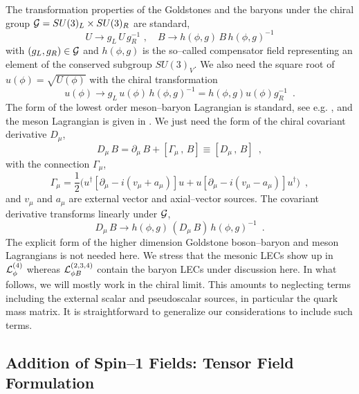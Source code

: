 The transformation properties of the
Goldstones and the baryons under the chiral group ${\cal G} = SU(3)_L
\times SU(3)_R$ are standard,
\begin{equation}
U \to g_L \, U \, g_R^{-1} \, \, , \quad
B \to h(\phi,g) \, B \, h(\phi,g)^{-1}
\label{ccwz}
\end{equation}
with $(g_L,g_R) \in {\cal G}$ and $h(\phi, g)$ is the so--called
compensator field representing an element of the conserved subgroup
$SU(3)_V$. We also need the square root of $u(\phi) = \sqrt{U(\phi )}$
with the chiral transformation
\begin{equation}
u(\phi ) \to g_L \, u(\phi ) \, h(\phi,g)^{-1} = h(\phi, g)
u(\phi ) g_R^{-1} \,  \, \, .
\label{sqrtu}
\end{equation}
The form of the lowest order meson--baryon
Lagrangian is standard, see e.g. \cite{bkmz}, and the
meson Lagrangian is given in \cite{gl85}. We just need the form of the
chiral covariant derivative $D_\mu$,
\begin{equation}
D_\mu \, B  = \partial_\mu \, B + [ \Gamma_\mu \, , \, B ]
\equiv [D_\mu \, , \, B] \, \, \, ,
\label{cova1}
\end{equation}
with the connection $\Gamma_\mu$,
\begin{equation}
\Gamma_\mu  = \frac{1}{2} \biggl( u^\dagger [\partial_\mu
-i(v_\mu+a_\mu)]u + u [\partial_\mu-i(v_\mu-a_\mu) ]u^\dagger
\biggr) \, \, \, ,
\label{cova2}
\end{equation}
and $v_\mu$ and $a_\mu$ are external vector and axial--vector sources.
The covariant derivative transforms linearly under ${\cal G}$,
\begin{equation}
D_\mu \, B \to h(\phi, g) \, (D_\mu \, B) \, h(\phi , g)^{-1}
\, \, \, .
\label{covg}
\end{equation}
The explicit form of the higher dimension  Goldstone boson--baryon
and meson Lagrangians is not needed here. We stress that the mesonic
LECs show up in ${\cal L}_{\phi}^{(4)}$ whereas  ${\cal L}_{\phi
  B}^{(2,3,4)}$ contain the baryon LECs under discussion here.
In what follows, we will mostly work in the chiral limit. This amounts
to neglecting terms including the external scalar and pseudoscalar
sources, in particular the quark mass matrix. It is straightforward to
generalize our considerations to include such terms.

\subsection{Addition of Spin--1 Fields: Tensor Field Formulation}

